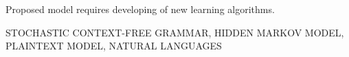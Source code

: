 Proposed model requires developing of new learning algorithms.






\MakeUppercase{stochastic context-free grammar, hidden Markov model, plaintext model, natural languages}


\clearpage
